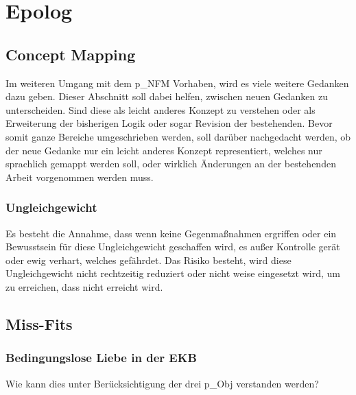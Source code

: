 \section{Epolog}

\subsection{Concept Mapping}

Im weiteren Umgang mit dem \gls{p_NFM} Vorhaben, wird es viele weitere Gedanken dazu geben. Dieser Abschnitt soll dabei helfen, zwischen neuen Gedanken zu unterscheiden. Sind diese als leicht anderes Konzept zu verstehen oder als Erweiterung der bisherigen Logik oder sogar Revision der bestehenden. Bevor somit ganze Bereiche umgeschrieben werden, soll darüber nachgedacht werden, ob der neue Gedanke nur ein leicht anderes Konzept representiert, welches nur sprachlich gemappt werden soll, oder wirklich Änderungen an der bestehenden Arbeit vorgenommen werden muss.


\subsubsection{Ungleichgewicht}

Es besteht die Annahme, dass wenn keine Gegenmaßnahmen ergriffen oder ein Bewusstsein für diese Ungleichgewicht geschaffen wird, es außer Kontrolle gerät oder ewig verhart, welches  gefährdet. 
Das Risiko besteht, wird diese Ungleichgewicht nicht rechtzeitig reduziert oder nicht weise eingesetzt wird, um  zu erreichen, dass  nicht erreicht wird.\\

\subsection{Miss-Fits}\label{subsec_MissFits}
\subsubsection{Bedingungslose Liebe in der EKB} Wie kann dies unter Berücksichtigung der drei \gls{p_Obj} verstanden werden?\\


